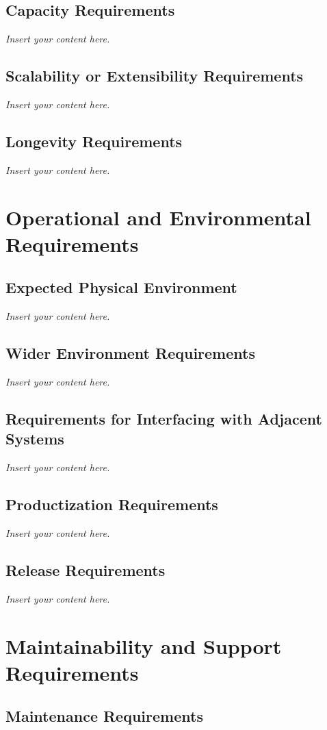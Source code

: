 \documentclass[12pt]{article}
\newcommand{\lips}{\textit{Insert your content here.}}
\begin{document}
\subsection{Capacity Requirements}
\lips
\subsection{Scalability or Extensibility Requirements}
\lips
\subsection{Longevity Requirements}
\lips

\section{Operational and Environmental Requirements}
\subsection{Expected Physical Environment}
\lips
\subsection{Wider Environment Requirements}
\lips
\subsection{Requirements for Interfacing with Adjacent Systems}
\lips
\subsection{Productization Requirements}
\lips
\subsection{Release Requirements}
\lips

\section{Maintainability and Support Requirements}
\subsection{Maintenance Requirements}
\end{document}
